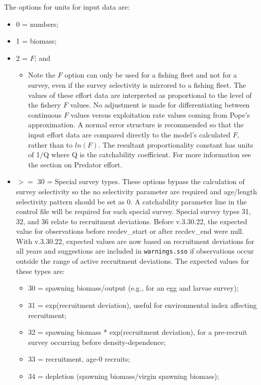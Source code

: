 \hypertarget{IndexUnits}{}
The options for units for input data are:	
\begin{itemize}
	\item 0  = numbers;
	\item 1  = biomass; 
	\item 2  = $F$; and
		\begin{itemize}
			\item Note the $F$ option can only be used for a fishing fleet and not for a survey, even if the survey selectivity is mirrored to a fishing fleet. The values of these effort data are interpreted as proportional to the level of the fishery $F$ values. No adjustment is made for differentiating between continuous $F$ values versus exploitation rate values coming from Pope's approximation. A normal error structure is recommended so that the input effort data are compared directly to the model's calculated $F$, rather than to $ln(F)$. The resultant proportionality constant has units of 1/Q where Q is the catchability coefficient. For more information see the section on \hypertarget{PredEffort}{Predator effort}.	
		\end{itemize}
	\item \hypertarget{SpecialSurvey}{} $>=$ 30 = Special survey types. These options bypass the calculation of survey selectivity so the no selectivity parameter are required and age/length selectivity pattern should be set as 0. A catchability parameter line in the control file will be required for each special survey. Special survey types 31, 32, and 36 relate to recruitment deviations. Before v.3.30.22, the expected value for observations before recdev\_start or after recdev\_end were null. With v.3.30.22, expected values are now based on recruitment deviations for all years and suggestions are included in \texttt{warnings.sso} if observations occur outside the range of active recruitment deviations. The expected values for these types are:
		\begin{itemize}
			\item 30 = spawning biomass/output (e.g., for an egg and larvae survey);
			\item 31 = exp(recruitment deviation), useful for environmental index affecting recruitment;
			\item 32 = spawning biomass * exp(recruitment deviation), for a pre-recruit survey occurring before density-dependence;
			\item 33 = recruitment, age-0 recruits;
			\item 34 = depletion (spawning biomass/virgin spawning biomass);

\end{itemize}
\end{itemize}
